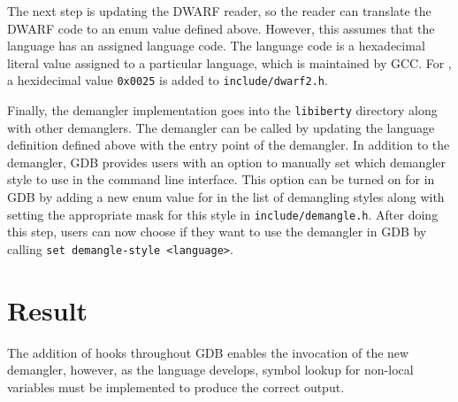 The next step is updating the DWARF reader, so the reader can translate the DWARF code to an enum value defined
above. However, this assumes that the language has an assigned language code.
The language code is a hexadecimal literal value assigned to a particular
language, which is maintained by GCC. For \CFA, a hexidecimal value
\verb|0x0025| is added to \verb|include/dwarf2.h|.

Finally, the demangler implementation goes into the \verb|libiberty| directory along with
other demanglers. The demangler can be called by updating the language
definition defined above with the entry point of the \CFAS demangler.
In addition to the demangler, GDB provides users with an option
to manually set which demangler style to use in the command line interface.
This option can be turned on for \CFAS in GDB by adding a new enum value for \CFAS in
the list of demangling styles along with setting the appropriate mask for this
style in \verb|include/demangle.h|. After doing this step, users can now choose
if they want to use the \CFAS demangler in GDB by calling \verb|set demangle-style <language>|.

\section{Result}
The addition of hooks throughout GDB enables the invocation of the new \CFAS demangler, however, as the
language develops, symbol lookup for non-local variables must be implemented to
produce the correct output.
